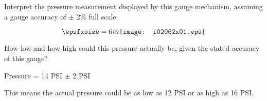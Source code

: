 

Interpret the pressure measurement displayed by this gauge mechanism, assuming a gauge accuracy of $\pm$ 2\% full scale:

$$\epsfxsize=6in \texttt{[image: i02062x01.eps]}$$

How low and how high could this pressure actually be, given the stated accuracy of this gauge?







Pressure = 14 PSI $\pm$ 2 PSI
 
\vskip 10pt

This means the actual pressure could be as low as 12 PSI or as high as 16 PSI.











